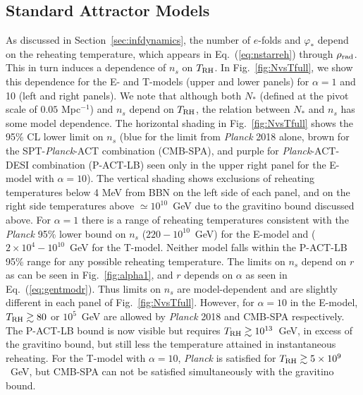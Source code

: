\documentclass[aps,prev,twocolumn,preprintnumbers,floatfix,nofootinbib]{revtex4-1}
\newcommand{\trh}{T_{\rm RH}}
\begin{document}
\subsection{Standard Attractor Models}
As discussed in Section~\ref{sec:infdynamics},
the number of $e$-folds and $\varphi_*$ depend on the reheating temperature, which appears in Eq.~(\ref{eq:nstarreh}) through $\rho_{\rm rad}$. This in turn induces a dependence of $n_s$ on $\trh$. In Fig.~\ref{fig:NvsTfull}, we show this dependence for the E- and T-models (upper and lower panels) for $\alpha = 1$ and 10 (left and right panels). We note that although both $N_*$ (defined at the pivot scale of $0.05$ Mpc$^{-1}$) and $n_s$ depend on $\trh$, the relation between $N_*$ and $n_s$ has some model dependence.  The horizontal shading in Fig.~\ref{fig:NvsTfull} shows the 95\% CL lower limit on $n_s$ (blue for the limit from {\it Planck} 2018 alone, brown for the SPT-{\it Planck}-ACT combination (CMB-SPA), and purple for {\it Planck}-ACT-DESI combination (P-ACT-LB) seen only in the upper right panel for the E-model with $\alpha = 10$).
The vertical shading shows exclusions of reheating temperatures below 4 MeV from BBN on the left side of each panel, and on the right side temperatures above $\simeq 10^{10}$~GeV due to the gravitino bound discussed above. For $\alpha = 1$ there is a range of reheating temperatures consistent with the {\it Planck} 95\% lower bound on $n_s$ ($220 - 10^{10}$~GeV)
for the E-model and ($2\times 10^4 - 10^{10}$~GeV for the T-model. Neither model falls within the P-ACT-LB 95\% range for any possible reheating temperature.
The limits on $n_s$ depend on $r$ as can be seen in Fig.~\ref{fig:alpha1}, and  $r$ depends on $\alpha$ as seen in Eq.~(\ref{eq:gentmodr}). Thus limits on $n_s$ are model-dependent and are slightly different in each panel of Fig.~\ref{fig:NvsTfull}.
However, for $\alpha = 10$ in the E-model, $\trh \gtrsim 80$ or $10^5$~GeV are allowed by {\it Planck} 2018 and CMB-SPA respectively. 
The P-ACT-LB bound is now visible but requires 
$\trh \gtrsim 10^{13}$~GeV, in excess of the gravitino bound, but still less the temperature attained in instantaneous reheating. For the T-model with $\alpha = 10$, {\it Planck} is satisfied for $\trh \gtrsim 5 \times 10^9$~GeV, but CMB-SPA can not be satisfied simultaneously with the gravitino bound.
\end{document}
